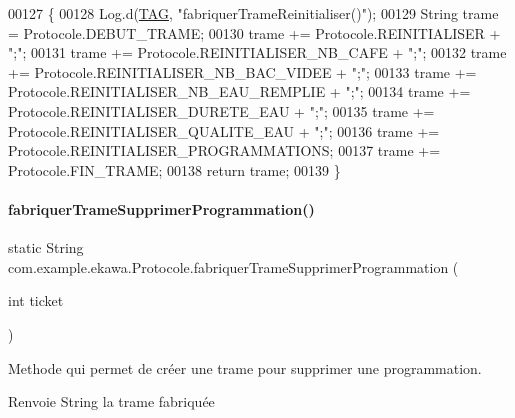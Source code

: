 \begin{DoxyCode}
00127     \{
00128         Log.d(\hyperlink{classcom_1_1example_1_1ekawa_1_1_protocole_ae9b68fa0daac528421b887f19413f8f5}{TAG}, \textcolor{stringliteral}{"fabriquerTrameReinitialiser()"});
00129         String trame = Protocole.DEBUT\_TRAME;
00130         trame += Protocole.REINITIALISER + \textcolor{stringliteral}{";"};
00131         trame += Protocole.REINITIALISER\_NB\_CAFE + \textcolor{stringliteral}{";"};
00132         trame += Protocole.REINITIALISER\_NB\_BAC\_VIDEE + \textcolor{stringliteral}{";"};
00133         trame += Protocole.REINITIALISER\_NB\_EAU\_REMPLIE + \textcolor{stringliteral}{";"};
00134         trame += Protocole.REINITIALISER\_DURETE\_EAU + \textcolor{stringliteral}{";"};
00135         trame += Protocole.REINITIALISER\_QUALITE\_EAU + \textcolor{stringliteral}{";"};
00136         trame += Protocole.REINITIALISER\_PROGRAMMATIONS;
00137         trame += Protocole.FIN\_TRAME;
00138         \textcolor{keywordflow}{return} trame;
00139     \}
\end{DoxyCode}
\mbox{\label{classcom_1_1example_1_1ekawa_1_1_protocole_afa3ca73b737062d6048c1a6cc9c8c79d}} 
\paragraph{\texorpdfstring{fabriquer\+Trame\+Supprimer\+Programmation()}{fabriquerTrameSupprimerProgrammation()}}
{\footnotesize\ttfamily static String com.\+example.\+ekawa.\+Protocole.\+fabriquer\+Trame\+Supprimer\+Programmation (\begin{DoxyParamCaption}\item[{int}]{ticket }\end{DoxyParamCaption})\hspace{0.3cm}{\ttfamily [static]}}



Methode qui permet de créer une trame pour supprimer une programmation. 

\begin{DoxyReturn}{Renvoie}
String la trame fabriquée 
\end{DoxyReturn}


